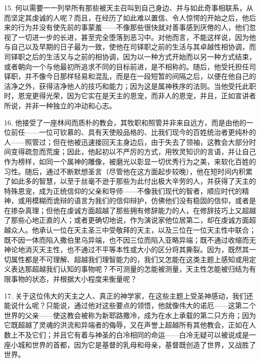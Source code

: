 15. 何以需要一一列举所有那些被天主召叫到自己身边、并与如此奇事相联系，从而坚定其虔诚的人呢？而且，在经历了如此难以置信、令人惊愕的开始之后，他后来的行为并没有使先前的事蒙羞——不像那些很快就对善事感到厌倦的人，他们忽视了一切进一步的长进，甚至完全堕落到恶习中。对他而言，不能这样说，因为他与自己以及早期的日子最为一致，使他在司铎职之前的生活与其卓越性相协调，而司铎职之后的生活又与之前的相协调，因为以一种方式开始而以另一种方式结束，或者朝向一个与他最初所追求不同的目标前进，是不相称的。\newline{}随后，他受托担任司铎职，并不像今日那样轻易和混乱，而是在一段短暂的间隔之后，以便在他自己的洁净之外，获得洁净他人的技巧和能力；因为这是属神秩序的法则。当他受托此职时，恩宠更得光荣，因为它实在是天主的恩宠，而非人的恩宠，并且，正如宣讲者所说，并非一种独立的冲动和心志。\par

16. 他接受了一座林间而质朴的教会，其牧职和照管并非来自远方，而是由他的一位前任——一位可钦慕的、具有天使般品格的、比我们现今的百姓统治者更纯朴的人——照管过；但在他被迅速接回天主身边后，由于失去了领袖，这教会大部分时间变得疏忽而荒废；因此，他起初以不严厉的方式，用牧灵知识的言语，并让自己作为榜样，如同一个属神的雕像，被磨光以彰显一切优秀行为之美，来软化百姓的习性。\newline{}随后，通过不断默想圣言（尽管他在这方面起步较晚），他在短时间内积累了如此多的智慧，以至于丝毫不逊于那些为此付出极大辛劳的人，并获得了天主的特殊恩宠，成为正统信仰的父亲和导师——不像我们现代的智者，顺应时代的精神，或用模糊而诡辩的语言为我们的信仰辩护，仿佛他们没有稳固的信仰，或者是在掺杂真理；但他在虔诚方面超越了那些拥有修辞能力的人，在修辞技巧上又超越了那些心地正直的人；或者更确切地说，作为演说家他位居第二，却在虔诚方面超越众人。\newline{}他承认一位在天主圣三中受敬拜的天主，以及三位在一位天主性中联合；既不因一体而陷入撒伯里乌异端，也不因三位而陷入亚略异端；既不通过收缩而无神论地消灭天主性，也不通过不平等本性或大小的区分将其撕裂。因为，既然其一切属性都是不可理解、超越我们理智能力的，我们又怎能在这类主题上感知或用定义表达那超越我们认知的事物呢？不可测量的怎能被测量，天主性怎能被归结为有限事物的状态，并根据大小程度来衡量呢？\par

17. 关于这位伟大的天主之人、真正的神学家，在这些主题上受圣神感动，我们还能说什么呢？只能说，通过他对这些要点的领悟，他就像伟大的诺厄——这第二个世界的父亲——使这教会被称为新耶路撒冷，成为在水上承载的第二只方舟；因为它既超越了灵魂的洪流和异端者的侮辱，又在声誉上超越所有其他教会，正如在人数上不及它们；并且它有着与神圣的白冷相同的命运——白冷无疑可以被说成是一座小城和世界的首都，因为它是基督的乳母和母亲，基督既创造了世界，又战胜了世界。\par

